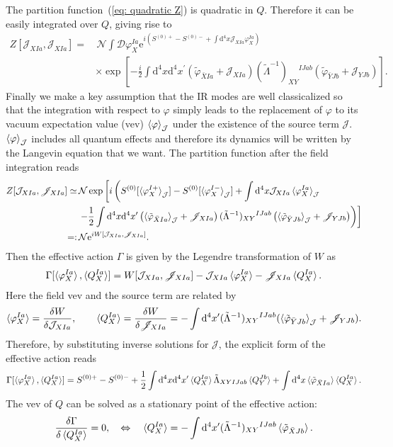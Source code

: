 \documentclass[a4paper,11pt]{article}
\newcommand{\var}[2]{\frac{\delta #1}{\delta #2}}
\newcommand{\dd}{\mathrm{d}}
\newcommand{\ee}{\mathrm{e}}
\newcommand{\scrD}{\mathscr{D}}
\newcommand{\calJ}{\mathcal{J}}
\newcommand{\scrJ}{\mathscr{J}}
\newcommand{\calN}{\mathcal{N}}
\newcommand{\bae}[1]{\begin{align} #1 \end{align}}
\begin{document}
The partition function~(\ref{eq: quadratic Z}) is quadratic in $Q$. Therefore it can be easily integrated over $Q$, giving rise to
\bae{
	Z[\calJ_{XIa},\scrJ_{XIa}]=&\,\calN\int\scrD\varphi_X^{Ia}\ee^{i(S^{(0)+}-S^{(0)-}+\int\dd^4x\calJ_{XIa}\varphi_X^{Ia})} \nonumber \\
	&\times\exp\left[-\frac{i}{2}\int\dd^4x\dd^4x^\prime
	\left(\tilde{\varphi}_{\bar{X}Ia}+\scrJ_{XIa}\right)(\tilde{\Lambda}^{-1})_{XY}{}^{IJab}\left(\tilde{\varphi}_{\bar{Y}Jb}+\scrJ_{YJb}\right)\right].
}
Finally we make a key assumption that the IR modes are well classicalized so that the integration with respect to $\varphi$ simply leads to
the replacement of $\varphi$ to its vacuum expectation value (vev) $\braket{\varphi}_\calJ$ under the existence of the source term $\calJ$.
$\braket{\varphi}_\calJ$ includes all quantum effects and therefore its dynamics will be written by the Langevin equation that we want.
The partition function after the field integration reads
\bae{\label{eq: Z after integration}
	Z[\calJ_{XIa},\scrJ_{XIa}]\simeq&\,\calN\exp\left[i\left(S^{(0)}[\braket{\varphi_X^{I+}}_\calJ]-S^{(0)}[\braket{\varphi_X^{I-}}_\calJ]
	+\int\dd^4x\calJ_{XIa}\braket{\varphi_X^{Ia}}_\calJ \right.\right. \nonumber \\
	&\left.\left. -\frac{1}{2}\int\dd^4x\dd^4x^\prime
	\left(\braket{\tilde{\varphi}_{\bar{X}Ia}}_\calJ+\scrJ_{XIa}\right)(\tilde{\Lambda}^{-1})_{XY}{}^{IJab}
	\left(\braket{\tilde{\varphi}_{\bar{Y}Jb}}_\calJ+\scrJ_{YJb}\right) 
	\right)\right] \nonumber \\
	=:&\,\calN\ee^{iW[\calJ_{XIa},\scrJ_{XIa}]}.
}
Then the effective action $\Gamma$ is given by the Legendre transformation of $W$ as
\bae{
	\Gamma[\braket{\varphi_X^{Ia}},\braket{Q_X^{Ia}}]=W[\calJ_{XIa},\scrJ_{XIa}]-\calJ_{XIa}\braket{\varphi_X^{Ia}}-\scrJ_{XIa}\braket{Q_X^{Ia}}.
}
Here the field vev and the source term are related by
\bae{
	\braket{\varphi_X^{Ia}}=\var{W}{\calJ_{XIa}}, \quad\quad \braket{Q_X^{Ia}}=\var{W}{\scrJ_{XIa}}=-\int\dd^4x^\prime
	(\tilde{\Lambda}^{-1})_{XY}{}^{IJab}
	(\braket{\tilde{\varphi}_{\bar{Y}Jb}}_\calJ+\scrJ_{YJb}).
}
Therefore, by substituting inverse solutions for $\scrJ$, the explicit form of the effective action reads
\bae{
	\Gamma[\braket{\varphi_X^{Ia}},\braket{Q_X^{Ia}}]=S^{(0)+}-S^{(0)-}+\frac{1}{2}\int\dd^4x\dd^4x^\prime\braket{Q_X^{Ia}}
	\tilde{\Lambda}_{XYIJab}\braket{Q_Y^{Jb}}+\int\dd^4x\braket{\tilde{\varphi}_{\bar{X}Ia}}\braket{Q_X^{Ia}}.
}
The vev of $Q$ can be solved as a stationary point of the effective action:
\bae{
	\var{\Gamma}{\braket{Q_X^{Ia}}}=0, \quad \Leftrightarrow \quad
	\braket{Q_X^{Ia}}=-\int\dd^4x^\prime(\tilde{\Lambda}^{-1})_{XY}{}^{IJab}\braket{\tilde{\varphi}_{\bar{X}Jb}}.
}
\end{document}
